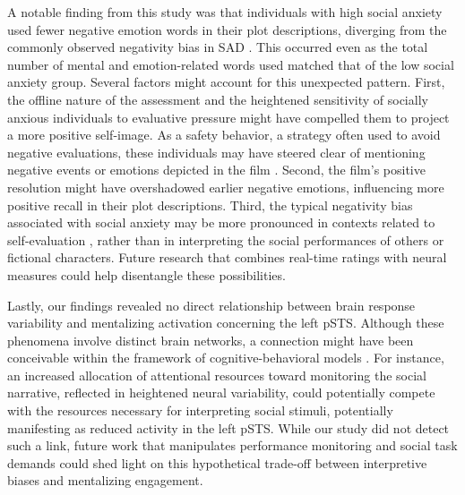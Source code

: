 A notable finding from this study was that individuals with high social anxiety used fewer negative emotion words in their plot descriptions, diverging from the commonly observed negativity bias in SAD \citep{hirsch2004information}. This occurred even as the total number of mental and emotion-related words used matched that of the low social anxiety group. Several factors might account for this unexpected pattern. First, the offline nature of the assessment and the heightened sensitivity of socially anxious individuals to evaluative pressure might have compelled them to project a more positive self-image. As a safety behavior, a strategy often used to avoid negative evaluations, these individuals may have steered clear of mentioning negative events or emotions depicted in the film \citep{prieto-fidalgo2024,wechsler1997}. Second, the film's positive resolution might have overshadowed earlier negative emotions, influencing more positive recall in their plot descriptions. Third, the typical negativity bias associated with social anxiety may be more pronounced in contexts related to self-evaluation \citep{koban2023,ballespi2019,hirsch2004negative,yoon2019}, rather than in interpreting the social performances of others or fictional characters. Future research that combines real-time ratings with neural measures could help disentangle these possibilities.

Lastly, our findings revealed no direct relationship between brain response variability and mentalizing activation concerning the left pSTS. Although these phenomena involve distinct brain networks, a connection might have been conceivable within the framework of cognitive-behavioral models \citep{clark1995,rapee1997}. For instance, an increased allocation of attentional resources toward monitoring the social narrative, reflected in heightened neural variability, could potentially compete with the resources necessary for interpreting social stimuli, potentially manifesting as reduced activity in the left pSTS. While our study did not detect such a link, future work that manipulates performance monitoring and social task demands could shed light on this hypothetical trade-off between interpretive biases and mentalizing engagement.

